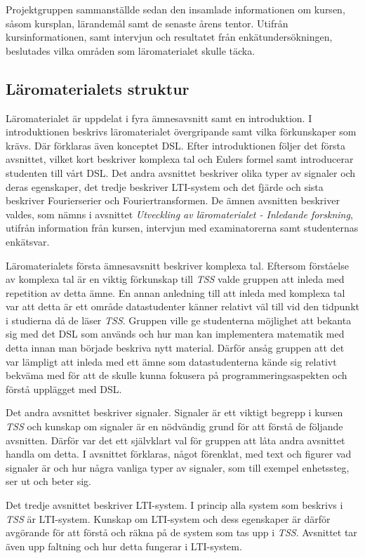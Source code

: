 \documentclass[]{article}
\begin{document}
Projektgruppen sammanställde sedan den insamlade informationen om
kursen, såsom kursplan, lärandemål samt de senaste årens
tentor. Utifrån kursinformationen, samt intervjun och resultatet från
enkätundersökningen, beslutades vilka områden som läromaterialet
skulle täcka.

\subsection{Läromaterialets struktur}

Läromaterialet är uppdelat i fyra ämnesavsnitt samt en introduktion. I
introduktionen beskrivs läromaterialet övergripande samt vilka
förkunskaper som krävs. Där förklaras även konceptet DSL. Efter
introduktionen följer det första avsnittet, vilket kort beskriver
komplexa tal och Eulers formel samt introducerar studenten till vårt
DSL. Det andra avsnittet beskriver olika typer av signaler och deras
egenskaper, det tredje beskriver LTI-system och det fjärde och sista
beskriver Fourierserier och Fouriertransformen. De ämnen avsnitten
beskriver valdes, som nämns i avsnittet \textit{Utveckling av
 läromaterialet - Inledande forskning}, utifrån information från
kursen, intervjun med examinatorerna samt studenternas enkätsvar.

Läromaterialets första ämnesavsnitt beskriver komplexa tal. Eftersom
förståelse av komplexa tal är en viktig förkunskap till \textit{TSS}
valde gruppen att inleda med repetition av detta ämne. En annan
anledning till att inleda med komplexa tal var att detta är ett område
datastudenter känner relativt väl till vid den tidpunkt i studierna då
de läser \textit{TSS}. Gruppen ville ge studenterna möjlighet att
bekanta sig med det DSL som används och hur man kan implementera
matematik med detta innan man började beskriva nytt material. Därför
ansåg gruppen att det var lämpligt att inleda med ett ämne som
datastudenterna kände sig relativt bekväma med för att de skulle kunna
fokusera på programmeringsaspekten och förstå upplägget med DSL.

Det andra avsnittet beskriver signaler. Signaler är ett viktigt
begrepp i kursen \textit{TSS} och kunskap om signaler är en nödvändig
grund för att förstå de följande avsnitten. Därför var det ett
självklart val för gruppen att låta andra avsnittet handla om detta. I
avsnittet förklaras, något förenklat, med text och figurer vad
signaler är och hur några vanliga typer av signaler, som till exempel
enhetssteg, ser ut och beter sig.

Det tredje avsnittet beskriver LTI-system. I princip alla system som
beskrivs i \textit{TSS} är LTI-system. Kunskap om LTI-system och dess
egenskaper är därför avgörande för att förstå och räkna på de system
som tas upp i \textit{TSS}. Avsnittet tar även upp faltning och hur
detta fungerar i LTI-system.
\end{document}
